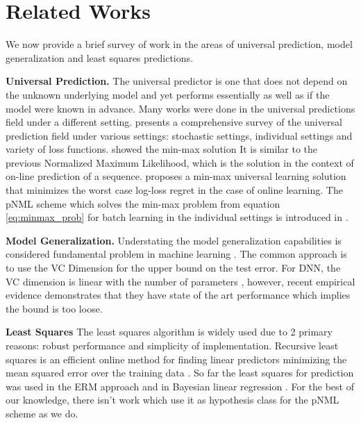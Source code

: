 \documentclass[conference,letterpaper]{IEEEtran}
\begin{document}
\section{Related Works} \label{sec:related_works}
We now provide a brief survey of work in the areas of universal prediction, model generalization and least squares predictions.

\textbf{Universal Prediction.}
The universal predictor is one that does not depend on the unknown underlying model and yet performs essentially as well as if the model were known in advance.
Many works were done in the universal predictions field under a different setting.
\cite{feder1992universal} presents a comprehensive survey of the universal prediction field under various settings: stochastic settings, individual settings and variety of loss functions. 
\cite{shtar1987universal} showed the min-max solution It is similar to the previous Normalized Maximum Likelihood, which is the solution in the context of on-line prediction of a sequence.  
\cite{Fogel2017} proposes a min-max universal learning solution that minimizes the worst case log-loss regret in the case of online learning.
The pNML scheme which solves the min-max problem from equation \ref{eq:minmax_prob} for batch learning in the individual settings is introduced in \cite{Fogel2018}.

\textbf{Model Generalization.} 
Understating the model generalization capabilities is considered fundamental problem in machine learning  \cite{vapnik2013nature}. 
The common approach is to use the VC Dimension for the upper bound on the test error.
For DNN, the VC dimension is linear with the number of parameters \cite{sontag1998vc}, however, recent empirical evidence demonstrates that they have state of the art performance which implies the bound is too loose.

\textbf{Least Squares}
The least squares algorithm is widely used due to 2 primary reasons: robust performance and simplicity of implementation.
Recursive least squares is an efficient online method for finding linear predictors minimizing the mean squared error over the training data \cite{hayes19969}.
So far the least squares for prediction was used in the ERM approach and in Bayesian linear regression \cite{fornalski2015applications}. For the best of our knowledge, there isn't work which use it as hypothesis class for the pNML scheme as we do.
\end{document}
